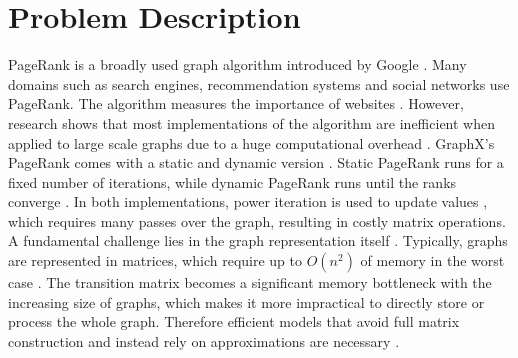 \documentclass[a4paper,12pt]{article}
\begin{document}
 

\section{Problem Description}
PageRank is a broadly used graph algorithm introduced by Google \cite{page_pagerank_1999}. Many domains such as search engines, recommendation systems and social networks use PageRank. The algorithm measures the importance of websites \cite{wu_efficient_2024}. However, research shows that most implementations of the algorithm are inefficient when applied to large scale graphs due to a huge computational overhead \cite{wu_efficient_2024}\cite{jayaram_dynamic_2024}\cite{yang_efficient_2024}. GraphX's PageRank comes with a static and dynamic version \cite{noauthor_graphx_nodate}. Static PageRank runs for a fixed number of iterations, while dynamic PageRank runs until the ranks converge \cite{noauthor_graphx_nodate}. In both implementations, power iteration is used to update values \cite{xin_graphx_2013}, which requires many passes over the graph, resulting in costly matrix operations.  A fundamental challenge lies in the graph representation itself \cite{noauthor_fast_nodate}. Typically, graphs are represented in matrices, which require up to $O(n^2)$ of memory in the worst case \cite{wu_efficient_2024}. The transition matrix becomes a significant memory bottleneck with the increasing size of graphs, which makes it more impractical to directly store or process the whole graph. Therefore efficient models that avoid full matrix construction and instead rely on approximations are necessary \cite{noauthor_fast_nodate}.
\end{document}
